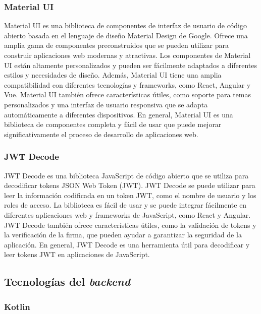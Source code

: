 \subsubsection{Material UI}

Material UI es una biblioteca de componentes de interfaz de usuario de código abierto basada en el lenguaje de diseño Material Design de Google. Ofrece una amplia gama de componentes preconstruidos que se pueden utilizar para construir aplicaciones web modernas y atractivas. Los componentes de Material UI están altamente personalizados y pueden ser fácilmente adaptados a diferentes estilos y necesidades de diseño. Además, Material UI tiene una amplia compatibilidad con diferentes tecnologías y frameworks, como React, Angular y Vue. Material UI también ofrece características útiles, como soporte para temas personalizados y una interfaz de usuario responsiva que se adapta automáticamente a diferentes dispositivos. En general, Material UI es una biblioteca de componentes completa y fácil de usar que puede mejorar significativamente el proceso de desarrollo de aplicaciones web.


\subsubsection{JWT Decode}

JWT Decode es una biblioteca JavaScript de código abierto que se utiliza para decodificar tokens JSON Web Token (JWT). JWT Decode se puede utilizar para leer la información codificada en un token JWT, como el nombre de usuario y los roles de acceso. La biblioteca es fácil de usar y se puede integrar fácilmente en diferentes aplicaciones web y frameworks de JavaScript, como React y Angular. JWT Decode también ofrece características útiles, como la validación de tokens y la verificación de la firma, que pueden ayudar a garantizar la seguridad de la aplicación. En general, JWT Decode es una herramienta útil para decodificar y leer tokens JWT en aplicaciones de JavaScript.






\newpage
\subsection{Tecnologías del \textit{backend}}


\subsubsection{Kotlin}


